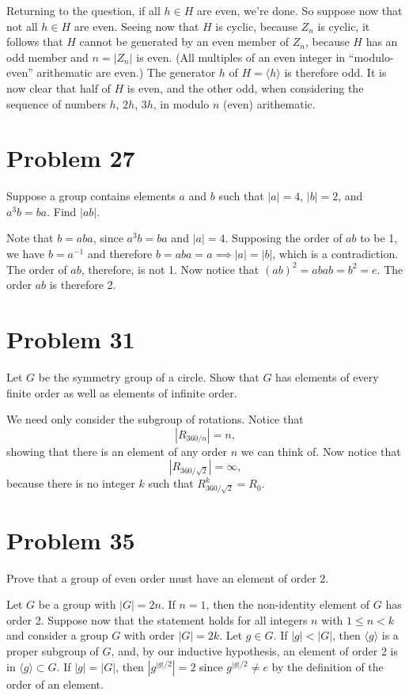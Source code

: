 \documentclass[12pt]{article}
\begin{document}
Returning to the question, if all $h\in H$ are even, we're done.  So suppose
now that not all $h\in H$ are even.  Seeing now that $H$ is cyclic, because $Z_n$
is cyclic, it follows that $H$ cannot be generated by an even member of $Z_n$,
because $H$ has an odd member and $n=|Z_n|$ is even.  (All multiples of an even
integer in ``modulo-even'' arithematic are even.)  The generator $h$ of $H=\langle h\rangle$ is
therefore odd.  It is now clear that half of $H$ is even, and the other odd, when
considering the sequence of numbers $h$, $2h$, $3h$, in modulo $n$ (even) arithematic.

\section*{Problem 27}

Suppose a group contains elements $a$ and $b$ such that $|a|=4$, $|b|=2$,
and $a^3b=ba$.  Find $|ab|$.

Note that $b=aba$, since $a^3b=ba$ and $|a|=4$.  Supposing the order of $ab$ to be 1, we have $b=a^{-1}$
and therefore $b=aba=a\implies |a|=|b|$, which is a contradiction.  The order
of $ab$, therefore, is not 1.
Now notice that $(ab)^2=abab = b^2=e$.  The order $ab$ is therefore 2.

\section*{Problem 31}

Let $G$ be the symmetry group of a circle.  Show that $G$ has elements of every
finite order as well as elements of infinite order.

We need only consider the subgroup of rotations.  Notice that
\begin{equation*}
|R_{360/n}|=n,
\end{equation*}
showing that there is an element of any order $n$ we can think of.
Now notice that
\begin{equation*}
|R_{360/\sqrt{2}}|=\infty,
\end{equation*}
because there is no integer $k$ such that $R_{360/\sqrt{2}}^k=R_0$.

\section*{Problem 35}

Prove that a group of even order must have an element of order 2.

Let $G$ be a group with $|G|=2n$.  If $n=1$, then the non-identity
element of $G$ has order 2.  Suppose now that the statement holds
for all integers $n$ with $1\leq n<k$ and consider a group $G$ with order $|G|=2k$.
Let $g\in G$.  If $|g|<|G|$,
then $\langle g\rangle$ is a proper subgroup of $G$, and, by our
inductive hypothesis, an element of order 2 is in $\langle g\rangle\subset G$.
If $|g|=|G|$, then $|g^{|g|/2}|=2$ since $g^{|g|/2}\neq e$ by
the definition of the order of an element.
\end{document}
